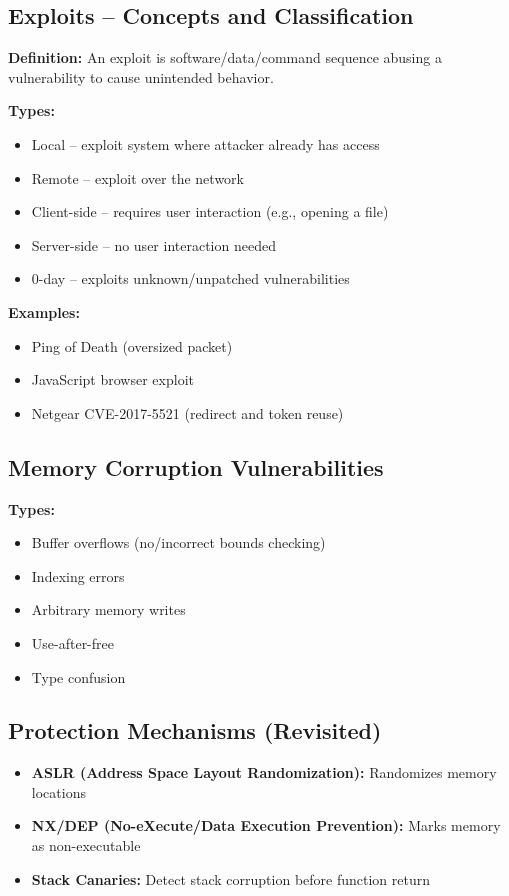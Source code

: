 \subsection{Exploits – Concepts and Classification}
{
\textbf{Definition:} An exploit is software/data/command sequence abusing a vulnerability to cause unintended behavior.

\textbf{Types:}
\begin{itemize}[noitemsep]
  \item Local – exploit system where attacker already has access
  \item Remote – exploit over the network
  \item Client-side – requires user interaction (e.g., opening a file)
  \item Server-side – no user interaction needed
  \item 0-day – exploits unknown/unpatched vulnerabilities
\end{itemize}

\textbf{Examples:}
\begin{itemize}[noitemsep]
  \item Ping of Death (oversized packet)
  \item JavaScript browser exploit
  \item Netgear CVE-2017-5521 (redirect and token reuse)
\end{itemize}
}

\subsection{Memory Corruption Vulnerabilities}
{
\textbf{Types:}
\begin{itemize}[noitemsep]
  \item Buffer overflows (no/incorrect bounds checking)
  \item Indexing errors
  \item Arbitrary memory writes
  \item Use-after-free
  \item Type confusion
\end{itemize}
}

\subsection{Protection Mechanisms (Revisited)}
{
\begin{itemize}[noitemsep]
  \item \textbf{ASLR (Address Space Layout Randomization):} Randomizes memory locations
  \item \textbf{NX/DEP (No-eXecute/Data Execution Prevention):} Marks memory as non-executable
  \item \textbf{Stack Canaries:} Detect stack corruption before function return
\end{itemize}
}

